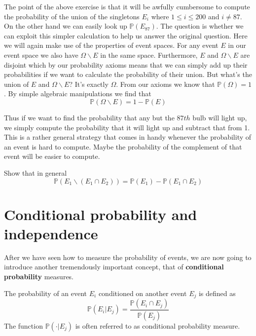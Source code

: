 \documentclass[a4paper,11pt,leqno]{report}
\begin{document}
The point of the above exercise is that it will be awfully cumbersome to compute the probability of the
union of the singletons $ {E_{i}} $ where $ 1 \leq i \leq 200 $ and $ i \not = 87 $. On the other hand
we can easily look up $ \mathbb{P}(E_{87}) $. The question is whether we can exploit this simpler calculation
to help us answer the original question. Here we will again make use of the properties of event spaces.
For any event $ E $ in our event space we also have $ \Omega \backslash E $ in the same space. Furthermore,
$ E $ and $ \Omega \backslash E $ are disjoint which by our probability axioms means that we can simply add
up their probabilities if we want to calculate the probability of their union. But what's the union
of $ E $ and $ \Omega \backslash E $? It's exactly $ \Omega $. From our axioms we know that 
$ \mathbb{P}(\Omega) = 1 $. By simple algebraic manipulations we find that 
\begin{equation}
\mathbb{P}(\Omega \backslash E) = 1 - \mathbb{P}(E)
\end{equation}

Thus if we want to find the probability that any but the $ 87th $ bulb will light up, we simply compute
the probability that it will light up and subtract that from 1. This is a rather general strategy that
comes in handy whenever the probability of an event is hard to compute. Maybe the probability of the
complement of that event will be easier to compute.

\begin{Exercise}
Show that in general $$ \mathbb{P}(E_{1}\backslash (E_{1}\cap E_{2})) 
= \mathbb{P}(E_{1}) - \mathbb{P}(E_{1}\cap E_{2}) $$
\end{Exercise}

\section{Conditional probability and independence}
After we have seen how to measure the probability of events, we are now going to introduce another
tremendously important concept, that of \textbf{conditional probability} measures.

\begin{Definition}{}
The probability of an event $ E_{i} $ conditioned on another event $ E_{j} $ is defined as
$$ \mathbb{P}(E_{i}|E_{j}) = \dfrac{\mathbb{P}(E_{i} \cap E_{j})}{\mathbb{P}(E_{j})} $$
The function $ \mathbb{P}(\cdot|E_{j}) $ is often referred to as conditional probability measure.
\label{condProb}
\end{Definition}
\end{document}
